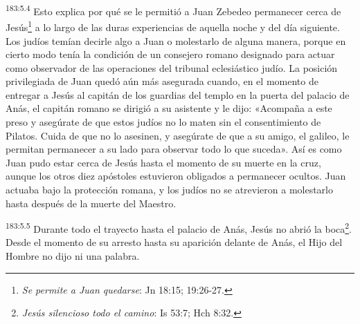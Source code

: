 \par 
\textsuperscript{183:5.4} Esto explica por qué se le permitió a Juan Zebedeo permanecer cerca de Jesús\footnote{\textit{Se permite a Juan quedarse}: Jn 18:15; 19:26-27.} a lo largo de las duras experiencias de aquella noche y del día siguiente. Los judíos temían decirle algo a Juan o molestarlo de alguna manera, porque en cierto modo tenía la condición de un consejero romano designado para actuar como observador de las operaciones del tribunal eclesiástico judío. La posición privilegiada de Juan quedó aún más asegurada cuando, en el momento de entregar a Jesús al capitán de los guardias del templo en la puerta del palacio de Anás, el capitán romano se dirigió a su asistente y le dijo: «Acompaña a este preso y asegúrate de que estos judíos no lo maten sin el consentimiento de Pilatos. Cuida de que no lo asesinen, y asegúrate de que a su amigo, el galileo, le permitan permanecer a su lado para observar todo lo que suceda». Así es como Juan pudo estar cerca de Jesús hasta el momento de su muerte en la cruz, aunque los otros diez apóstoles estuvieron obligados a permanecer ocultos. Juan actuaba bajo la protección romana, y los judíos no se atrevieron a molestarlo hasta después de la muerte del Maestro.

\par 
\textsuperscript{183:5.5} Durante todo el trayecto hasta el palacio de Anás, Jesús no abrió la boca\footnote{\textit{Jesús silencioso todo el camino}: Is 53:7; Hch 8:32.}. Desde el momento de su arresto hasta su aparición delante de Anás, el Hijo del Hombre no dijo ni una palabra.
